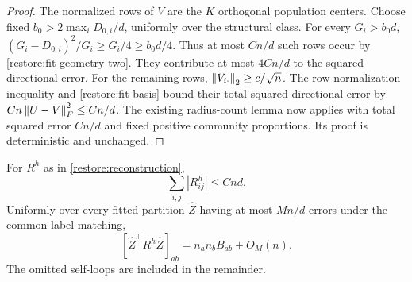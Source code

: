 \begin{proof}
The normalized rows of $V$ are the $K$ orthogonal population centers.
Choose fixed $b_0>2\max_iD_{0,i}/d$, uniformly over the structural class.
For every $G_i>b_0d$,
$(G_i-D_{0,i})^2/G_i\ge G_i/4\ge b_0d/4$.
Thus at most $Cn/d$ such rows occur by
\eqref{restore:fit-geometry-two}. They contribute at most $4Cn/d$
to the squared directional error. For the remaining rows,
$\left\lVert V_{i\cdot}\right\rVert_2\ge c/\sqrt n$. The row-normalization inequality
and \eqref{restore:fit-basis} bound their total squared directional
error by $Cn\left\lVert U-V\right\rVert_F^2\le Cn/d$.
The existing radius-count lemma now applies with total squared error
$Cn/d$ and fixed positive community proportions. Its proof is
deterministic and unchanged.
\end{proof}

\begin{lemma}
\label{restore:fit-block-totals}
For $R^h$ as in \eqref{restore:reconstruction},
\begin{equation}\label{restore:fit-global-absolute}
 \sum_{i,j}|R^h_{ij}|\le Cnd.
\end{equation}
Uniformly over every fitted partition $\widehat Z$ having at most
$Mn/d$ errors under the common label matching,
\begin{equation}\label{restore:fit-total-accuracy}
 [\widehat Z^\top R^h\widehat Z]_{ab}
       =n_an_bB_{ab}+O_M(n).
\end{equation}
The omitted self-loops are included in the remainder.
\end{lemma}

